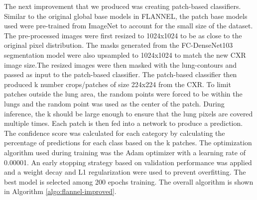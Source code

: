 \documentclass{sigkddExp}
\begin{document}
The next improvement that we produced was creating patch-based classifiers.
Similar to the original global base models in FLANNEL, the patch base models
used were pre-trained from ImageNet to account for the small size of the
dataset. The pre-processed images were first resized to 1024x1024 to be as close
to the original pixel distribution. The masks generated from the FC-DenseNet103
segmentation model were also upsampled to 1024x1024 to match the new CXR image
size.The resized images were then masked with the lung-contours and passed as
input to the patch-based classifier. The patch-based classifier then produced k
number crops/patches of size 224x224 from the CXR. To limit patches outside the
lung area, the random points were forced to be within the lungs and the random
point was used as the center of the patch. During inference, the k should be
large enough to ensure that the lung pixels are covered multiple times. Each
patch is then fed into a network to produce a prediction. The confidence score
was calculated for each category by calculating the percentage of predictions
for each class based on the k patches. The optimization algorithm used during
training was the Adam optimizer with a learning rate of 0.00001. An early
stopping strategy based on validation performance was applied and a weight decay
and L1 regularization were used to prevent overfitting. The best model is
selected among 200 epochs training. The overall algorithm is shown in Algorithm
\ref{algo:flannel-improved}.
\end{document}
